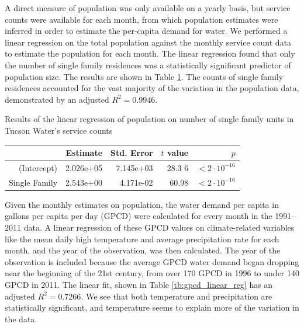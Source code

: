 \documentclass[opre,nonblindrev]{informs3} %
\begin{document}
A direct measure of population was only available on a yearly basis, but service counts were available for each month, from which population estimates were inferred in order to estimate the per-capita demand for water.
We performed a linear regression on the total population against the monthly service count data to estimate the population for each month.
The linear regression found that only the number of single family residences was a statistically significant predictor of population size.
The results are shown in Table \ref{tb:population_linear_reg}.
The counts of single family residences accounted for the vast majority of the variation in the population data, demonstrated by an adjusted $R^2 = 0.9946$.

\begin{table}
	\TABLE
	{
		Results of the linear regression of population on number of single family units in Tucson Water's service counts
		\label{tb:population_linear_reg}
	}
	{\begin{tabular}{rrrrr}
		\hline
						   & Estimate  & Std. Error & $t$ value & $p$ \\
		\hline
		(Intercept)    & 2.026e+05 & 7.145e+03  & 28.3 6    & $<2 \cdot 10^{-16}$ \\
		Single Family  & 2.543e+00 & 4.171e-02  & 60.98     & $<2 \cdot 10^{-16}$ \\
		\hline
	\end{tabular}}
	{}
\end{table}

Given the monthly estimates on population, the water demand per capita in gallons per capita per day (GPCD) were calculated for every month in the 1991--2011 data.
A linear regression of these GPCD values on climate-related variables like the mean daily high temperature and average precipitation rate for each month, and the year of the observation, was then calculated.
The year of the observation is included because the average GPCD water demand began dropping near the beginning of the 21st century, from over 170 GPCD in 1996 to under 140 GPCD in 2011.
The linear fit, shown in Table \ref{tb:gpcd_linear_reg} has an adjusted $R^2 = 0.7266$.
We see that both temperature and precipitation are statistically significant, and temperature seems to explain more of the variation in the data.
\end{document}

